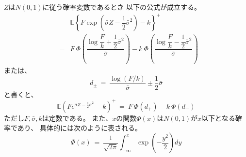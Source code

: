 \documentclass[uplatex,a4j,12pt,dvipdfmx]{jsarticle}
\begin{document}
$Z$は$N(0,1)$に従う確率変数であるとき
以下の公式が成立する。
%
%
\begin{eqnarray*}
	&&
	\mathbb{E}
	\left\{
	F
	\exp
	\left(
	\bar{\sigma} Z - \dfrac{1}{2} \bar{\sigma}^{2}
	\right)
	-k
	\right\}^{+}
	\\ &=&
	F
	\ \! \Phi
	\left(
	\dfrac{
		\log \dfrac{F}{k} + \dfrac{1}{2} \bar{\sigma}^{2}
	}
	{\bar{\sigma}}
	\right)
	-
	k
	\ \! \Phi
	\left(
	\dfrac{
		\log \dfrac{F}{k} - \dfrac{1}{2} \bar{\sigma}^{2}
	}
	{\bar{\sigma}}
	\right)
\end{eqnarray*}
%
%
または、
$$
	d_{\pm}
	\ = \
	\dfrac{
		\log (F/k)
	}
	{\bar{\sigma}}
	\pm \dfrac{1}{2} \bar{\sigma}
$$
と書くと、
$$
	\mathbb{E}
	\left(
	F e^{\bar{\sigma}Z - \frac{1}{2} \bar{\sigma}^{2} }
	-
	k
	\right)^{+}
	\ = \
	F
	\ \! \Phi
	\left(
	d_{+}
	\right)
	-
	k
	\ \! \Phi
	\left(
	d_{-}
	\right)
$$
ただし$F,\bar{\sigma},k$は定数である。
また、$x$の関数$\Phi(x)$は$N(0,1)$が$x$以下となる確率であり、
具体的には次のように表される。
$$
	\Phi(x)
	\ = \
	\dfrac{1}{\sqrt{2 \pi}}
	\int^{x}_{- \infty} \exp \left( - \dfrac{y^{2}}{2} \right) dy
$$

${}$
\end{document}
